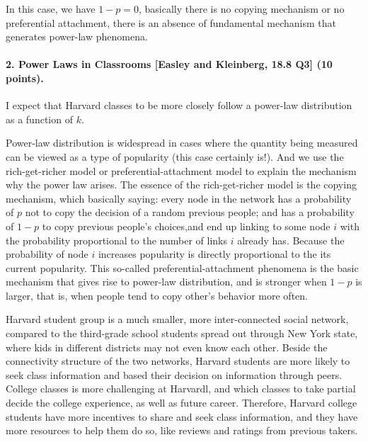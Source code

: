\documentclass[11pt]{article} %
\begin{document}
\begin{itemize}
In this case, we have $1-p =0$, basically there is no copying mechanism or no preferential attachment, there is an absence of fundamental mechanism that generates power-law phenomena.


\end{itemize}









\paragraph{2. Power Laws in Classrooms [Easley and Kleinberg, 18.8 Q3] (10 points).}    


I expect that Harvard classes to be more closely follow a power-law distribution as a function of $k$.  

Power-law distribution is widespread in cases where the quantity being measured can be viewed as a type of popularity (this case certainly is!). And we use the rich-get-richer model or preferential-attachment model to explain the mechanism why the power law arises. The essence of the rich-get-richer model is the copying mechanism, which basically saying: every node in the network has a probability of $p$ not to copy the decision of a random previous people; and has a probability of $1-p$ to copy previous people's choices,and end up linking to some node $i$ with the probability proportional to the number of links $i$ already has. Because the probability of node $i$ increases popularity is directly proportional to the its current popularity. This so-called preferential-attachment phenomena is the basic mechanism that gives rise to power-law distribution, and is stronger when $1-p$ is larger, that is, when people tend to copy other's behavior more often.  

Harvard student group is a much smaller, more inter-connected social network, compared to the third-grade school students spread out through New York state, where kids in different districts may not even know each other. Beside the connectivity structure of the two networks, Harvard students are more likely to seek class information and based their decision on information through peers. College classes is more challenging at Harvardl, and which classes to take partial decide the college experience, as well as future career. Therefore, Harvard college students have more incentives to share and seek class information, and they have more resources to help them do so, like reviews and ratings from previous takers.  
\end{document}
